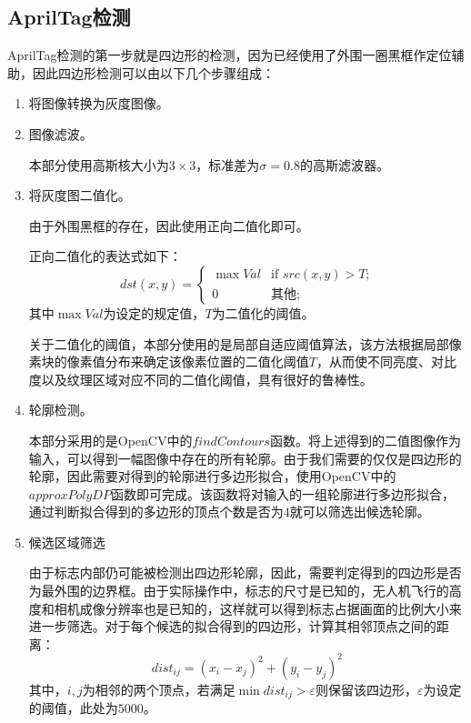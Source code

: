 \subsection{AprilTag检测}


AprilTag检测的第一步就是四边形的检测，因为已经使用了外围一圈黑框作定位辅助，因此四边形检测可以由以下几个步骤组成：
\begin{enumerate}[1)]
\item 将图像转换为灰度图像。
\item 图像滤波。

本部分使用高斯核大小为$3\times3$，标准差为$\sigma=0.8$的高斯滤波器。
\item 将灰度图二值化。

由于外围黑框的存在，因此使用正向二值化即可。

正向二值化的表达式如下：
\begin{equation}
    dst(x,y) = \left\{ 
    \begin{array}{ll}
        \max{Val} & \textrm{if $src(x,y)>T$;}\\
        0 & \textrm{其他;}
    \end{array} \right.
\end{equation}
其中$\max{Val}$为设定的规定值，$T$为二值化的阈值。

关于二值化的阈值，本部分使用的是局部自适应阈值算法，该方法根据局部像素块的像素值分布来确定该像素位置的二值化阈值$T$，从而使不同亮度、对比度以及纹理区域对应不同的二值化阈值，具有很好的鲁棒性。
\item 轮廓检测。

本部分采用的是OpenCV中的$findContours$函数。将上述得到的二值图像作为输入，可以得到一幅图像中存在的所有轮廓。由于我们需要的仅仅是四边形的轮廓，因此需要对得到的轮廓进行多边形拟合，使用OpenCV中的$approxPolyDP$函数即可完成。该函数将对输入的一组轮廓进行多边形拟合，通过判断拟合得到的多边形的顶点个数是否为$4$就可以筛选出候选轮廓。

\item 候选区域筛选

由于标志内部仍可能被检测出四边形轮廓，因此，需要判定得到的四边形是否为最外围的边界框。由于实际操作中，标志的尺寸是已知的，无人机飞行的高度和相机成像分辨率也是已知的，这样就可以得到标志占据画面的比例大小来进一步筛选。对于每个候选的拟合得到的四边形，计算其相邻顶点之间的距离：
\begin{equation}
dist_{ij}=(x_i-x_j)^2+(y_i-y_j)^2
\end{equation}
其中，$i,j$为相邻的两个顶点，若满足$\min{dist_{ij}}>\varepsilon$则保留该四边形，$\varepsilon$为设定的阈值，此处为$5000$。
\end{enumerate}

